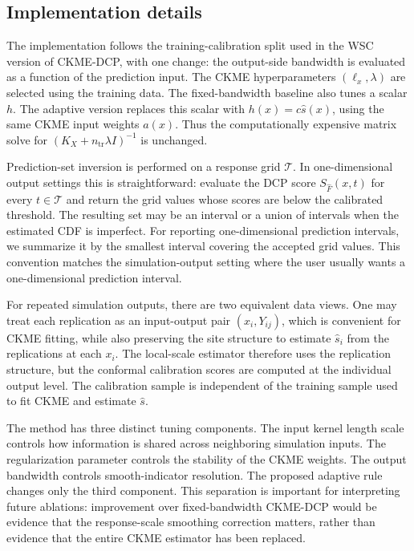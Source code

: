 \documentclass[11pt]{article}
\newcommand{\Tcal}{\mathcal T}
\begin{document}
\subsection{Implementation details}
\label{sec:implementation}

The implementation follows the training-calibration split used in the WSC version of CKME-DCP, with one change: the output-side bandwidth is evaluated as a function of the prediction input. The CKME hyperparameters \((\ell_x,\lambda)\) are selected using the training data. The fixed-bandwidth baseline also tunes a scalar \(h\). The adaptive version replaces this scalar with \(h(x)=c\widehat s(x)\), using the same CKME input weights \(a(x)\). Thus the computationally expensive matrix solve for \((K_X+n_{\mathrm{tr}}\lambda I)^{-1}\) is unchanged.

Prediction-set inversion is performed on a response grid \(\Tcal\). In one-dimensional output settings this is straightforward: evaluate the DCP score \(S_{\widehat F}(x,t)\) for every \(t\in\Tcal\) and return the grid values whose scores are below the calibrated threshold. The resulting set may be an interval or a union of intervals when the estimated CDF is imperfect. For reporting one-dimensional prediction intervals, we summarize it by the smallest interval covering the accepted grid values. This convention matches the simulation-output setting where the user usually wants a one-dimensional prediction interval.

For repeated simulation outputs, there are two equivalent data views. One may treat each replication as an input-output pair \((x_i,Y_{ij})\), which is convenient for CKME fitting, while also preserving the site structure to estimate \(\widehat s_i\) from the replications at each \(x_i\). The local-scale estimator therefore uses the replication structure, but the conformal calibration scores are computed at the individual output level. The calibration sample is independent of the training sample used to fit CKME and estimate \(\widehat s\).

The method has three distinct tuning components. The input kernel length scale controls how information is shared across neighboring simulation inputs. The regularization parameter controls the stability of the CKME weights. The output bandwidth controls smooth-indicator resolution. The proposed adaptive rule changes only the third component. This separation is important for interpreting future ablations: improvement over fixed-bandwidth CKME-DCP would be evidence that the response-scale smoothing correction matters, rather than evidence that the entire CKME estimator has been replaced.
\end{document}
